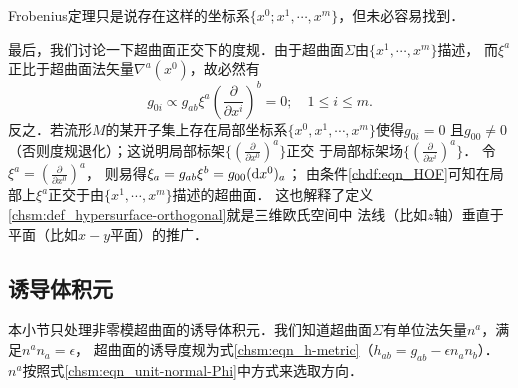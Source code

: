 Frobenius定理只是说存在这样的坐标系$\{x^0;x^1,\cdots,x^m\}$，但未必容易找到．

最后，我们讨论一下超曲面正交下的度规．由于超曲面$\Sigma$由$\{x^1,\cdots,x^m\}$描述，
而$\xi^a$正比于超曲面法矢量$\nabla^a(x^0)$，故必然有
\begin{equation}
    g_{0i}\propto g_{ab} \xi^a \left(\frac{\partial }{\partial x^i} \right)^b=0;
    \quad 1\leqslant i \leqslant m .
\end{equation}
反之．若流形$M$的某开子集上存在局部坐标系$\{x^0,x^1,\cdots,x^m\}$使得$g_{0i}=0$
且$g_{00}\neq 0$（否则度规退化）；这说明局部标架$\{(\frac{\partial }{\partial x^0} )^a\}$正交
于局部标架场$\{(\frac{\partial }{\partial x^i} )^a\}$．
令$\xi^a=(\frac{\partial }{\partial x^0} )^a$，
则易得$\xi_a= g_{ab}\xi^b = g_{00}({\rm d}x^0)_a$；
由条件\eqref{chdf:eqn_HOF}可知在局部上$\xi^a$正交于由$\{x^1,\cdots,x^m\}$描述的超曲面．
这也解释了定义\ref{chsm:def_hypersurface-orthogonal}就是三维欧氏空间中
法线（比如$z$轴）垂直于平面（比如$x-y$平面）的推广．




\subsection{诱导体积元}\label{chsm:sec_induced-VE}
本小节只处理非零模超曲面的诱导体积元．我们知道超曲面$\Sigma$有单位法矢量$n^a$，满足$n^a n_a=\epsilon$，
超曲面的诱导度规为式\eqref{chsm:eqn_h-metric}（$h_{ab} {=} g_{ab} -\epsilon {n}_a {n}_b$）．
$n^a$按照式\eqref{chsm:eqn_unit-normal-Phi}中方式来选取方向．

